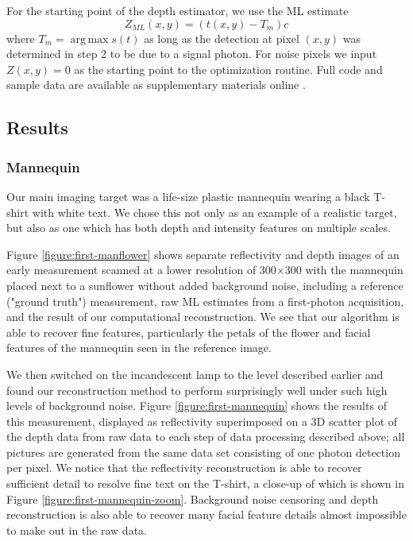 For the starting point of the depth estimator, we use the ML estimate
\begin{equation}
Z_{ML}(x,y) = (t(x,y) - T_m)c
\end{equation}
where $T_m = \operatorname{arg\,max} s(t)$ as long as the detection at pixel $(x,y)$ was determined in step 2 to be due to a signal photon. For noise pixels we input $Z(x,y) = 0$ as the starting point to the optimization routine. Full code and sample data are available as supplementary materials online \cite{kirmani-first}.

\subsection{Results}

\subsubsection{Mannequin}
Our main imaging target was a life-size plastic mannequin wearing a black T-shirt with white text. We chose this not only as an example of a realistic target, but also as one which has both depth and intensity features on multiple scales.

Figure \ref{figure:first-manflower} shows separate reflectivity and depth images of an early measurement scanned at a lower resolution of 300$\times$300 with the mannequin placed next to a sunflower without added background noise, including a reference ("ground truth") measurement, raw ML estimates from a first-photon acquisition, and the result of our computational reconstruction. We see that our algorithm is able to recover fine features, particularly the petals of the flower and facial features of the mannequin seen in the reference image.

We then switched on the incandescent lamp to the level described earlier and found our reconstruction method to perform surprisingly well under such high levels of background noise. Figure \ref{figure:first-mannequin} shows the results of this measurement, displayed as reflectivity superimposed on a 3D scatter plot of the depth data from raw data to each step of data processing described above; all pictures are generated from the same data set consisting of one photon detection per pixel. We notice that the reflectivity reconstruction is able to recover sufficient detail to resolve fine text on the T-shirt, a close-up of which is shown in Figure \ref{figure:first-mannequin-zoom}. Background noise censoring and depth reconstruction is also able to recover many facial feature details almost impossible to make out in the raw data.

